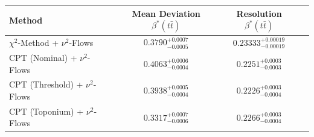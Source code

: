     \begin{tabular}{lccc}
        \toprule
        Method & Mean Deviation $\beta^*(t\bar{t})$ & Resolution $\beta^*(t\bar{t})$ \\
        \midrule
        $\chi^2$-Method + $\nu^2$-Flows & $0.3790^{+0.0007}_{-0.0005}$ & $0.23333^{+0.00019}_{-0.00019}$ \\
        CPT (Nominal) + $\nu^2$-Flows & $0.4063^{+0.0006}_{-0.0004}$ & $0.2251^{+0.0003}_{-0.0003}$ \\
        CPT (Threshold) + $\nu^2$-Flows & $0.3938^{+0.0005}_{-0.0004}$ & $0.2226^{+0.0003}_{-0.0004}$ \\
        CPT (Toponium) + $\nu^2$-Flows & $0.3317^{+0.0007}_{-0.0006}$ & $0.2266^{+0.0003}_{-0.0004}$ \\
        \bottomrule
    \end{tabular}
